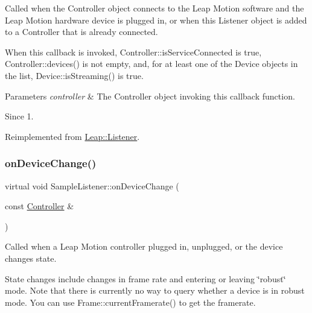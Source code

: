Called when the Controller object connects to the Leap Motion software and the Leap Motion hardware device is plugged in, or when this Listener object is added to a Controller that is already connected.

When this callback is invoked, Controller\+::is\+Service\+Connected is true, Controller\+::devices() is not empty, and, for at least one of the Device objects in the list, Device\+::is\+Streaming() is true.


\begin{DoxyCodeInclude}
\end{DoxyCodeInclude}



\begin{DoxyParams}{Parameters}
{\em controller} & The Controller object invoking this callback function. \\
\hline
\end{DoxyParams}
\begin{DoxySince}{Since}
1. 
\end{DoxySince}


Reimplemented from \hyperlink{class_leap_1_1_listener_adfef79f9a03b342384aaa17f3a8ebf15}{Leap\+::\+Listener}.

\mbox{\label{class_sample_listener_a4030bfba07f6a34dabf77459968acd39}} 
\subsubsection{\texorpdfstring{on\+Device\+Change()}{onDeviceChange()}\hspace{0.1cm}{\footnotesize\ttfamily [1/2]}}
{\footnotesize\ttfamily virtual void Sample\+Listener\+::on\+Device\+Change (\begin{DoxyParamCaption}\item[{const \hyperlink{class_leap_1_1_controller}{Controller} \&}]{ }\end{DoxyParamCaption})\hspace{0.3cm}{\ttfamily [virtual]}}

Called when a Leap Motion controller plugged in, unplugged, or the device changes state.

State changes include changes in frame rate and entering or leaving \char`\"{}robust\char`\"{} mode. Note that there is currently no way to query whether a device is in robust mode. You can use Frame\+::current\+Framerate() to get the framerate.


